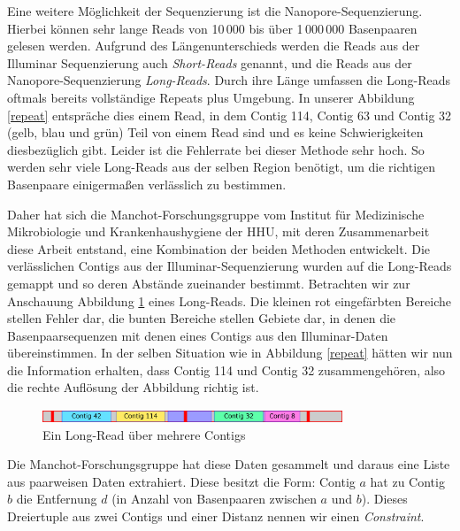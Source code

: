 Eine weitere Möglichkeit der Sequenzierung ist die Nanopore-Sequenzierung. Hierbei können sehr lange Reads von 10\,000 bis über 1\,000\,000 Basenpaaren gelesen werden. Aufgrund des Längenunterschieds werden die Reads aus der Illuminar Sequenzierung auch \emph{Short-Reads} genannt, und die Reads aus der Nanopore-Sequenzierung \emph{Long-Reads}. Durch ihre Länge umfassen die Long-Reads oftmals bereits vollständige Repeats plus Umgebung. In unserer Abbildung \ref{repeat} entspräche dies einem Read, in dem Contig 114, Contig 63 und Contig 32 (gelb, blau und grün) Teil von einem Read sind und es keine Schwierigkeiten diesbezüglich gibt. Leider ist die Fehlerrate bei dieser Methode sehr hoch. 
So werden sehr viele Long-Reads aus der selben Region benötigt, um die richtigen Basenpaare einigermaßen verlässlich zu bestimmen.


Daher hat sich die Manchot-Forschungsgruppe vom Institut für Medizinische Mikrobiologie und Krankenhaushygiene der HHU, mit deren Zusammenarbeit diese Arbeit entstand, eine Kombination der beiden Methoden entwickelt.
Die verlässlichen Contigs aus der Illuminar-Sequenzierung wurden auf die Long-Reads gemappt und so deren Abstände zueinander bestimmt. Betrachten wir zur Anschauung Abbildung \ref{longread} eines Long-Reads. Die kleinen rot eingefärbten Bereiche stellen Fehler dar, die bunten Bereiche stellen Gebiete dar, in denen die Basenpaarsequenzen mit denen eines Contigs aus den Illuminar-Daten übereinstimmen. In der selben Situation wie in Abbildung \ref{repeat} hätten wir nun die Information erhalten, dass Contig 114 und Contig 32 zusammengehören, also die rechte Auflösung der Abbildung richtig ist. 
\begin{figure}[b!]
\begin{center}
\includegraphics[width=0.8\textwidth]{bilder/longread}
\end{center}
\caption{Ein Long-Read über mehrere Contigs}
\label{longread}
\end{figure}
Die Manchot-Forschungsgruppe hat diese Daten gesammelt und daraus eine Liste aus paarweisen Daten extrahiert. Diese besitzt die Form: Contig $a$ hat zu Contig $b$ die Entfernung $d$ (in Anzahl von Basenpaaren zwischen $a$ und $b$). Dieses Dreiertuple aus zwei Contigs und einer Distanz nennen wir einen \emph{Constraint}.


